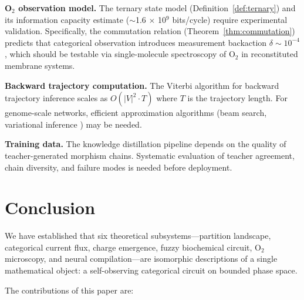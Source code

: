 \documentclass[twocolumn,10pt,a4paper]{article}
\theoremstyle{definition}
\theoremstyle{remark}
\begin{document}
\textbf{O$_2$ observation model.} The ternary state model (Definition~\ref{def:ternary}) and its information capacity estimate ($\sim$1.6 $\times$ 10$^9$ bits/cycle) require experimental validation. Specifically, the commutation relation (Theorem~\ref{thm:commutation}) predicts that categorical observation introduces measurement backaction $\delta \sim 10^{-4}$ \citep{Sachikonye2024e}, which should be testable via single-molecule spectroscopy of O$_2$ in reconstituted membrane systems.

\textbf{Backward trajectory computation.} The Viterbi algorithm for backward trajectory inference scales as $O(|V|^2 \cdot T)$ where $T$ is the trajectory length. For genome-scale networks, efficient approximation algorithms (beam search, variational inference \citep{Pearl1988}) may be needed.

\textbf{Training data.} The knowledge distillation pipeline depends on the quality of teacher-generated morphism chains. Systematic evaluation of teacher agreement, chain diversity, and failure modes is needed before deployment.

\section{Conclusion}
\label{sec:conclusion}

We have established that six theoretical subsystems---partition landscape, categorical current flux, charge emergence, fuzzy biochemical circuit, O$_2$ microscopy, and neural compilation---are isomorphic descriptions of a single mathematical object: a self-observing categorical circuit on bounded phase space.

The contributions of this paper are:
\end{document}
